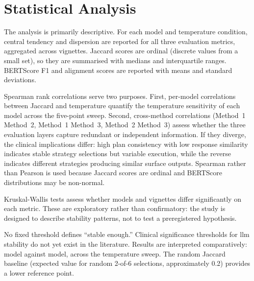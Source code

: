 \section{Statistical Analysis}
\label{sec:meth-stats}

The analysis is primarily descriptive. For each model and temperature
condition, central tendency and dispersion are reported for all three
evaluation metrics, aggregated across vignettes.
Jaccard scores are ordinal (discrete values from a small set), so they are
summarised with medians and interquartile ranges. BERTScore F1 and alignment
scores are reported with means and standard deviations.

Spearman rank correlations serve two purposes. First, per-model
correlations between Jaccard and temperature quantify the temperature
sensitivity of each model across the five-point sweep. Second,
cross-method correlations (Method~1 \vs Method~2, Method~1 \vs Method~3,
Method~2 \vs Method~3) assess whether the three evaluation layers capture
redundant or independent information. If they diverge, the clinical
implications differ: high plan consistency with low response similarity
indicates stable strategy selections but variable execution, while the
reverse indicates different strategies producing similar surface outputs.
Spearman rather than Pearson is used because Jaccard scores are ordinal
and BERTScore distributions may be non-normal.

Kruskal-Wallis tests assess whether models and vignettes differ
significantly on each metric. These are exploratory rather than
confirmatory: the study is designed to describe stability patterns, not to
test a preregistered hypothesis.

No fixed threshold defines ``stable enough.'' Clinical significance
thresholds for \gls{llm} stability do not yet exist in the literature.
Results are interpreted comparatively: model against model, across the
temperature sweep. The random Jaccard baseline (expected value for random
2-of-6 selections, approximately 0.2) provides a lower reference point.

